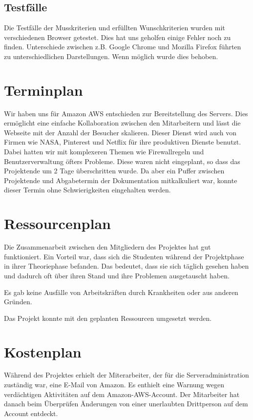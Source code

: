 \documentclass{article}
\begin{document}
\subsection{Testfälle}
Die Testfälle der Musskriterien und erfüllten Wunschkriterien wurden mit verschiedenen Browser getestet. Dies hat uns geholfen einige Fehler noch zu finden. Unterschiede zwischen z.B. Google Chrome und Mozilla Firefox führten zu unterschiedlichen Darstellungen. Wenn möglich wurde dies behoben.

\section{Terminplan}
Wir haben uns für Amazon AWS entschieden zur Bereitstellung des Servers. Dies ermöglicht eine einfache Kollaboration zwischen den Mitarbeitern und lässt die Webseite mit der Anzahl der Besucher skalieren. Dieser Dienst wird auch von Firmen wie NASA, Pinterest und Netflix für ihre produktiven Dienste benutzt.
Dabei hatten wir mit komplexeren Themen wie Firewallregeln und Benutzerverwaltung öfters Probleme. Diese waren nicht eingeplant, so dass das Projektende um 2 Tage überschritten wurde. Da aber ein Puffer zwischen Projektende und Abgabetermin der Dokumentation mitkalkuliert war, konnte dieser Termin ohne Schwierigkeiten eingehalten werden.


\section{Ressourcenplan}
Die Zusammenarbeit zwischen den Mitgliedern des Projektes hat gut funktioniert. Ein Vorteil war, dass sich die Studenten während der Projektphase in ihrer Theoriephase befanden. Das bedeutet, dass sie sich täglich gesehen haben und dadurch oft über ihren Stand und ihre Problemen ausgetauscht haben.

\smallskip
\noindent Es gab keine Ausfälle von Arbeitskräften durch Krankheiten oder aus anderen Gründen.

\smallskip
\noindent Das Projekt konnte mit den geplanten Ressourcen umgesetzt werden.

\section{Kostenplan}

Während des Projektes erhielt der Miterarbeiter, der für die Serveradministration zuständig war, eine E-Mail von Amazon. Es enthielt eine Warnung wegen verdächtigen Aktivitäten auf dem Amazon-AWS-Account. Der Mitarbeiter hat danach beim Überprüfen Änderungen von einer unerlaubten Drittperson auf dem Account entdeckt.
\end{document}
